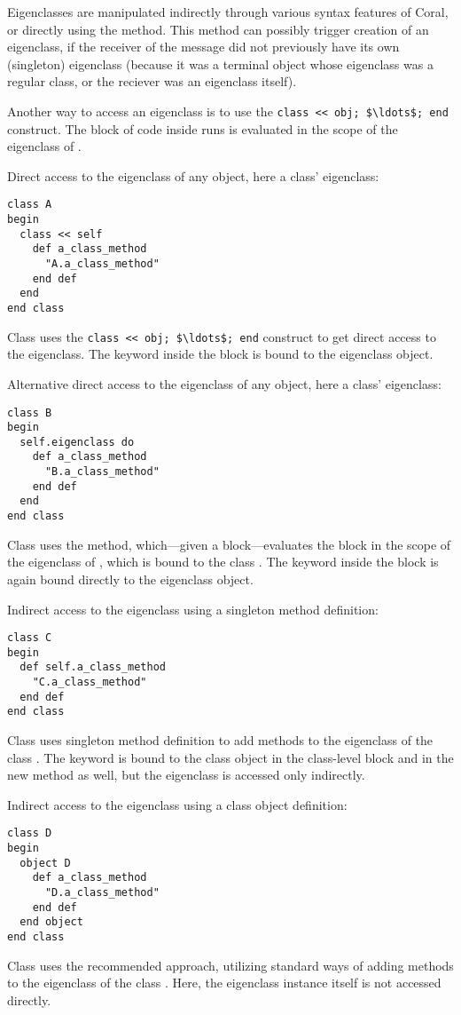 Eigenclasses are manipulated indirectly through various syntax features of Coral, or directly using the  method. This method can possibly trigger creation of an eigenclass, if the receiver of the  message did not previously have its own (singleton) eigenclass (because it was a terminal object whose eigenclass was a regular class, or the reciever was an eigenclass itself). 

Another way to access an eigenclass is to use the \lstinline!class << obj; $\ldots$; end! construct. The block of code inside runs is evaluated in the scope of the eigenclass of . 

\example Direct access to the eigenclass of any object, here a class' eigenclass:
\begin{lstlisting}
class A
begin
  class << self
    def a_class_method
      "A.a_class_method"
    end def
  end
end class
\end{lstlisting}
Class  uses the \lstinline!class << obj; $\ldots$; end! construct to get direct access to the eigenclass. The keyword  inside the block is bound to the eigenclass object. 

\example Alternative direct access to the eigenclass of any object, here a class' eigenclass:
\begin{lstlisting}
class B
begin
  self.eigenclass do
    def a_class_method
      "B.a_class_method"
    end def
  end
end class
\end{lstlisting}
Class  uses the  method, which---given a block---evaluates the block in the scope of the eigenclass of , which is bound to the class . The keyword  inside the block is again bound directly to the eigenclass object. 

\example Indirect access to the eigenclass using a singleton method definition:
\begin{lstlisting}
class C
begin
  def self.a_class_method
    "C.a_class_method"
  end def
end class
\end{lstlisting}
Class  uses singleton method definition to add methods to the eigenclass of the class . The keyword  is bound to the class object in the class-level block and in the new method as well, but the eigenclass is accessed only indirectly. 

\example Indirect access to the eigenclass using a class object definition:
\begin{lstlisting}
class D
begin
  object D
    def a_class_method
      "D.a_class_method"
    end def
  end object
end class
\end{lstlisting}
Class  uses the recommended approach, utilizing standard ways of adding methods to the eigenclass of the class . Here, the eigenclass instance itself is not accessed directly.  

